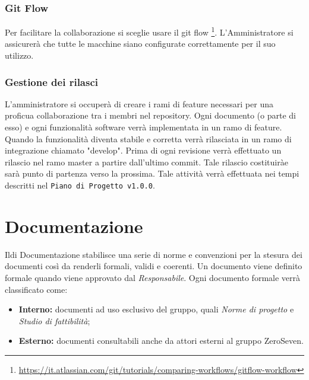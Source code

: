 \subsubsection{Git Flow}
Per facilitare la collaborazione si sceglie usare il git flow \footnote{\url{https://it.atlassian.com/git/tutorials/comparing-workflows/gitflow-workflow}}. L'Amministratore si assicurerà che tutte le macchine siano configurate correttamente per il suo utilizzo.
\subsubsection{Gestione dei rilasci}
L'amministratore si occuperà di creare i rami di feature necessari per una proficua collaborazione tra i membri nel repository. Ogni documento (o parte di esso) e ogni funzionalità software verrà implementata in un ramo di feature. Quando la funzionalità diventa stabile e corretta verrà rilasciata in un ramo di integrazione chiamato "develop". Prima di ogni revisione verrà effettuato un rilascio nel ramo master a partire dall'ultimo commit. Tale rilascio costituiràe sarà punto di partenza verso la prossima. Tale attività verrà effettuata nei tempi descritti nel \texttt{Piano di Progetto v1.0.0}. 


\section{Documentazione}
Ildi Documentazione stabilisce una serie di norme e convenzioni per la stesura dei documenti così da renderli formali, validi e coerenti.
Un documento viene definito formale quando viene approvato dal \textit{Responsabile}.
Ogni documento formale verrà classificato come:
\begin{itemize}
	\item \textbf{Interno:} documenti ad uso esclusivo del gruppo, quali \textit{Norme di progetto} e \textit{Studio di fattibilità};
	\item \textbf{Esterno:} documenti consultabili anche da attori esterni al gruppo ZeroSeven.
	
\end{itemize}

